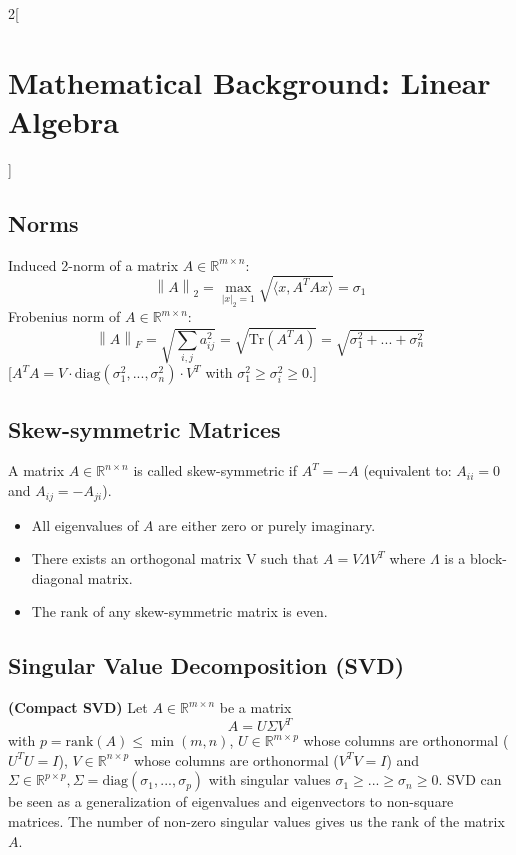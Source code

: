 \documentclass[oneside,fontsize=11pt,paper=a4]{scrartcl}
\begin{document}
\begin{multicols}{2}[\section{Mathematical Background: Linear Algebra}]
\subsection{Norms}
Induced 2-norm of a matrix $A \in \mathbb{R}^{m \times n}$:
\newcommand\norm[1]{\left\lVert#1\right\rVert}
\begin{equation*}
	\norm{A}_2 = \max_{|x|_2 = 1} \sqrt{\langle x, A^T A x \rangle} = \sigma_1
\end{equation*}
Frobenius norm of $A \in \mathbb{R}^{m \times n}$:
\begin{equation*}
	\norm{A}_F = \sqrt{\sum_{i,j} a_{ij}^2} = \sqrt{\text{Tr}(A^T A)} = \sqrt{\sigma_1^2 + ... + \sigma_n ^2}
\end{equation*}
[$A^T A = V \cdot \text{diag}(\sigma_1^2, ..., \sigma_n^2) \cdot V^T$ with $\sigma_1^2 \geq \sigma_i^2 \geq 0$.]

\subsection{Skew-symmetric Matrices}
A matrix $A \in \mathbb{R}^{n \times n} $ is called skew-symmetric if $A^T = -A$ (equivalent to: $A_{ii} = 0$ and $A_{ij} = - A_{ji}$).
\begin{itemize}
    \item All eigenvalues of $A$ are either zero or purely imaginary.
    \item There exists an orthogonal matrix V such that $A = V \Lambda V^T$ where $\Lambda$ is a block-diagonal matrix.
    \item The rank of any skew-symmetric matrix is even.
\end{itemize}

\subsection{Singular Value Decomposition (SVD)}
\textbf{(Compact SVD)} Let $A \in \mathbb{R}^{m \times n}$ be a matrix
\begin{equation*}
    A = U \Sigma V^T
\end{equation*}
with $p = \text{rank}(A) \leq \min(m,n)$, $U \in \mathbb{R}^{m \times p}$ whose columns are orthonormal ($U^T U = I$), $V \in \mathbb{R}^{n \times p}$ whose columns are orthonormal ($V^T V = I$) and $\Sigma \in \mathbb{R}^{p \times p}, \Sigma = \text{diag}(\sigma_1, ... , \sigma_p)$ with singular values $\sigma_1 \geq ... \geq \sigma_n \geq 0$.
SVD can be seen as a generalization of eigenvalues and eigenvectors to non-square matrices.
The number of non-zero singular values gives us the rank of the matrix $A$.\par
\vspace{3mm}


\end{multicols}
\end{document}

